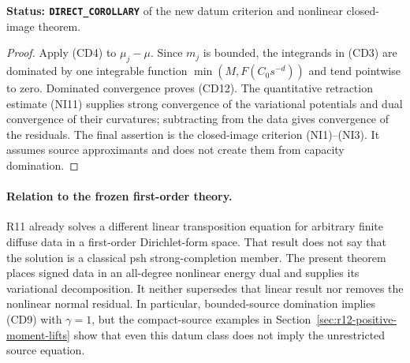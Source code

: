 \noindent\textbf{Status: \texttt{DIRECT\_COROLLARY}} of
the new datum criterion and nonlinear closed-image theorem.

\begin{proof}
Apply (CD4) to $\mu_j-\mu$. Since $m_j$ is bounded, the
integrands in (CD3) are dominated by one integrable function
$\min(M,F(C_0s^{-d}))$ and tend pointwise to zero. Dominated
convergence proves (CD12). The quantitative retraction estimate
(NI11) supplies strong convergence of the variational potentials
and dual convergence of their curvatures; subtracting from the
data gives convergence of the residuals. The final assertion is
the closed-image criterion (NI1)--(NI3). It assumes source
approximants and does not create them from capacity domination.
\end{proof}

\paragraph{Relation to the frozen first-order theory.}
R11 already solves a different linear transposition equation for
arbitrary finite diffuse data in a first-order Dirichlet-form
space. That result does not say that the solution is a classical
psh strong-completion member. The present theorem places signed
data in an all-degree nonlinear energy dual and supplies its
variational decomposition. It neither supersedes that linear
result nor removes the nonlinear normal residual. In particular,
bounded-source domination implies (CD9) with $\gamma=1$, but
the compact-source examples in Section~\ref{sec:r12-positive-moment-lifts}
show that even this datum class does not imply the unrestricted
source equation.
